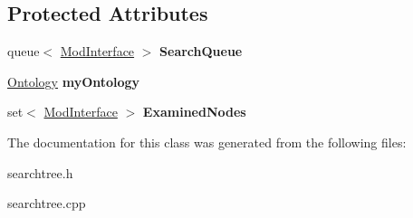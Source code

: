 \subsection*{\-Protected \-Attributes}
\begin{DoxyCompactItemize}
\item 
\hypertarget{classSearchTree_a90d0e9b01acc82994cd5a4301993df66}{queue$<$ \hyperlink{classModInterface}{\-Mod\-Interface} $>$ {\bfseries \-Search\-Queue}}\label{classSearchTree_a90d0e9b01acc82994cd5a4301993df66}

\item 
\hypertarget{classSearchTree_a9f9e373000da48125c9659dadf6ab3e4}{\hyperlink{classOntology}{\-Ontology} {\bfseries my\-Ontology}}\label{classSearchTree_a9f9e373000da48125c9659dadf6ab3e4}

\item 
\hypertarget{classSearchTree_a00aab2e0d59d6537c3507c4636369694}{set$<$ \hyperlink{classModInterface}{\-Mod\-Interface} $>$ {\bfseries \-Examined\-Nodes}}\label{classSearchTree_a00aab2e0d59d6537c3507c4636369694}

\end{DoxyCompactItemize}


\-The documentation for this class was generated from the following files\-:\begin{DoxyCompactItemize}
\item 
searchtree.\-h\item 
searchtree.\-cpp\end{DoxyCompactItemize}
